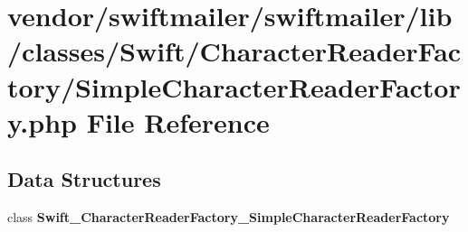 \section{vendor/swiftmailer/swiftmailer/lib/classes/\+Swift/\+Character\+Reader\+Factory/\+Simple\+Character\+Reader\+Factory.php File Reference}
\label{_simple_character_reader_factory_8php}
\subsection*{Data Structures}
\begin{DoxyCompactItemize}
\item 
class {\bf Swift\+\_\+\+Character\+Reader\+Factory\+\_\+\+Simple\+Character\+Reader\+Factory}
\end{DoxyCompactItemize}
